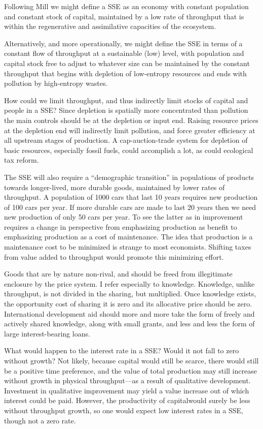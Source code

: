 \documentclass[
]{book}
\begin{document}
Following Mill we might define a SSE as an economy with constant population and constant stock of capital,
maintained by a low rate of throughput that is within the regenerative and assimilative capacities of the ecosystem.

Alternatively, and more operationally, we might
define the SSE in terms of a constant flow of throughput at a sustainable (low) level, with population and capital stock
free to adjust to whatever size can be maintained by the constant throughput that begins with depletion of low-entropy
resources and ends with pollution by high-entropy wastes.

How could we limit throughput, and thus indirectly limit stocks of capital and people in a SSE? Since depletion is
spatially more concentrated than pollution the main controls should be at the depletion or input end. Raising resource
prices at the depletion end will indirectly limit pollution, and force greater efficiency at all upstream stages of
production. A cap-auction-trade system for depletion of basic resources, especially fossil fuels, could accomplish a
lot, as could ecological tax reform.

The SSE will also require a ``demographic transition'' in populations of products towards longer-lived, more durable
goods, maintained by lower rates of throughput. A population of 1000 cars that last 10 years requires new production
of 100 cars per year. If more durable cars are made to last 20 years then we need new production of only 50 cars per
year. To see the latter as in improvement requires a change in perspective from emphasizing production as benefit to
emphasizing production as a cost of maintenance.
The idea that production is a maintenance cost to be minimized
is strange to most economists.
Shifting taxes from value added to throughput would promote this minimizing effort.

Goods that are by nature non-rival, and should be freed from
illegitimate enclosure by the price system. I refer especially to knowledge. Knowledge, unlike throughput, is not
divided in the sharing, but multiplied.
Once knowledge exists, the opportunity cost of sharing it is zero and its allocative price should be zero. International
development aid should more and more take the form of freely and actively shared knowledge, along with small
grants, and less and less the form of large interest-bearing loans.

What would happen to the interest rate in a SSE? Would it not fall to zero without growth? Not likely, because capital
would still be scarce, there would still be a positive time preference, and the value of total production may still
increase without growth in physical throughput---as a result of qualitative development. Investment in qualitative
improvement may yield a value increase out of which interest could be paid. However, the productivity of capitalwould surely be less without throughput growth, so one would expect low interest rates in a SSE, though not a zero
rate.
\end{document}
